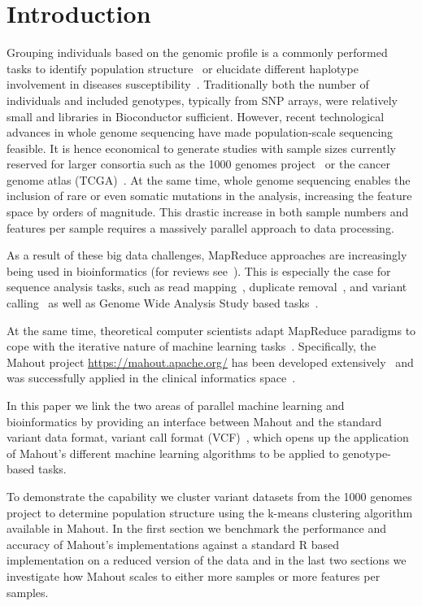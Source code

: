 \documentclass{bioinfo}
\begin{document}
\section{Introduction}

Grouping individuals based on the genomic profile is a commonly performed tasks to identify population structure~\cite{Gao2007} or elucidate different haplotype involvement in diseases susceptibility~\cite{Laitman2013}.  Traditionally both the number of individuals and included genotypes, typically from SNP arrays, were relatively small and libraries in Bioconductor sufficient. However, recent technological advances in whole genome sequencing have made population-scale sequencing feasible. It is hence economical to generate studies with sample sizes currently reserved for larger consortia such as the 1000 genomes project~\cite{1KG2012} or the cancer genome atlas (TCGA)~\cite{TCGA2013}. At the same time, whole genome sequencing enables the inclusion of rare or even somatic mutations in the analysis, increasing the feature space by orders of magnitude. This drastic increase in both sample numbers and features per sample requires a massively parallel approach to data processing. 

As a result of these big data challenges, MapReduce approaches are increasingly being used in bioinformatics (for reviews see~\cite{Zou2013, Qiu2010,Taylor2010}). This is especially the case for sequence analysis tasks, such as read mapping~\cite{Schatz2009}, duplicate removal~\cite{Jourdren2012}, and variant calling~\cite{Langmead2009, McKenna2010} as well as Genome Wide Analysis Study based tasks~\cite{Huang2013, Guo2014}.


At the same time, theoretical computer scientists adapt MapReduce paradigms to cope with the iterative nature of machine learning tasks~\cite{Chu2009}. Specifically, the Mahout project \url{https://mahout.apache.org/} has been developed extensively~\cite{Ranger2007, Owen2011} and was successfully applied in the clinical informatics space~\cite{Dong2013}.

In this paper we link the two areas of parallel machine learning and bioinformatics by providing an interface between Mahout and the standard variant data format, variant call format (VCF)~\cite{1KG2012}, which opens up the application of Mahout's different machine learning algorithms to be applied to genotype-based tasks. 

To demonstrate the capability we cluster variant datasets from the 1000 genomes project to determine population structure using the k-means clustering algorithm available in Mahout. In the first section we benchmark the performance and accuracy of Mahout's implementations against a standard R based implementation on a reduced version of the data and in the last two sections we investigate how Mahout scales to either more samples or more features per samples.   
\end{document}
